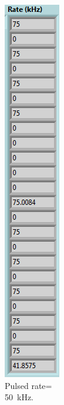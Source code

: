 \begin{figure}[H]
\begin{minipage}{0.24\textwidth}
		\caption{Pulsed rate=\\50~kHz.}
		\label{fig:50khz}
	\end{minipage}
	\begin{minipage}{0.24\textwidth}
		\centering
		\includegraphics[width=.7\linewidth]{IMG/ch5/latch_tests/fig18}

\end{minipage}
\end{figure}

